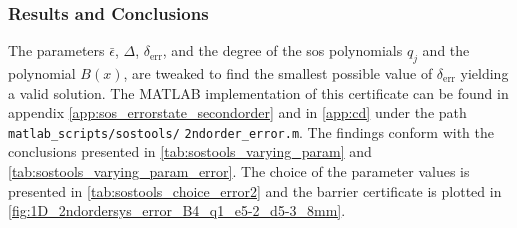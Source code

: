 
\subsubsection{Results and Conclusions}

\vspace{-2mm}
The parameters $\bar{\epsilon}$, $\Delta$, $\delta_\text{err}$, and the degree of the \gls{sos} polynomials $q_j$ and the polynomial $B(x)$, are tweaked to find the smallest possible value of $\delta_\text{err}$ yielding a valid solution.
The MATLAB implementation of this certificate can be found in appendix \ref{app:sos_errorstate_secondorder} and in \autoref{app:cd} under the path \texttt{matlab\_scripts/}\texttt{sostools/} \texttt{2ndorder\_error.m}.
The findings conform with the conclusions presented in \autoref{tab:sostools_varying_param} and \autoref{tab:sostools_varying_param_error}. The choice of the parameter values is presented in \autoref{tab:sostools_choice_error2} and the  barrier certificate is plotted in \autoref{fig:1D_2ndordersys_error_B4_q1_e5-2_d5-3_8mm}.


